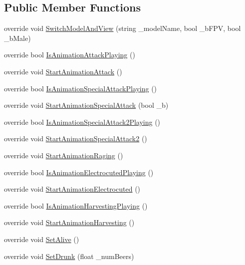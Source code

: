 \subsection*{Public Member Functions}
\begin{DoxyCompactItemize}
\item 
override void \mbox{\hyperlink{class_mecanim_s_d_x_a5a790d1838ab1258de11be176a5298b8}{Switch\+Model\+And\+View}} (string \+\_\+model\+Name, bool \+\_\+b\+F\+PV, bool \+\_\+b\+Male)
\item 
override bool \mbox{\hyperlink{class_mecanim_s_d_x_a1b94f6f47f059463f95ae6d61c80a565}{Is\+Animation\+Attack\+Playing}} ()
\item 
override void \mbox{\hyperlink{class_mecanim_s_d_x_a543eebebb28bb83ffc3b5cb55820f38c}{Start\+Animation\+Attack}} ()
\item 
override bool \mbox{\hyperlink{class_mecanim_s_d_x_ab53b82df62046df779432b2777526e69}{Is\+Animation\+Special\+Attack\+Playing}} ()
\item 
override void \mbox{\hyperlink{class_mecanim_s_d_x_ac65f5041a8f62a2f7e7eec84b8cdf446}{Start\+Animation\+Special\+Attack}} (bool \+\_\+b)
\item 
override bool \mbox{\hyperlink{class_mecanim_s_d_x_a8d61341c1b126e94156629faba4e2683}{Is\+Animation\+Special\+Attack2\+Playing}} ()
\item 
override void \mbox{\hyperlink{class_mecanim_s_d_x_af08e226abe0cacc72cced0bb6db08480}{Start\+Animation\+Special\+Attack2}} ()
\item 
override void \mbox{\hyperlink{class_mecanim_s_d_x_a6e4c25012d26e7b01fdf4e252c65314d}{Start\+Animation\+Raging}} ()
\item 
override bool \mbox{\hyperlink{class_mecanim_s_d_x_a00c9160c184e2c78a3ec4ef8bd9b0c83}{Is\+Animation\+Electrocuted\+Playing}} ()
\item 
override void \mbox{\hyperlink{class_mecanim_s_d_x_ac029e3a33e4dd0b7aa49a16da767c0bb}{Start\+Animation\+Electrocuted}} ()
\item 
override bool \mbox{\hyperlink{class_mecanim_s_d_x_a453c7d9636ac85f8bc1eec14f9b9684b}{Is\+Animation\+Harvesting\+Playing}} ()
\item 
override void \mbox{\hyperlink{class_mecanim_s_d_x_accb9a9db5430753e8129f98d10e3e547}{Start\+Animation\+Harvesting}} ()
\item 
override void \mbox{\hyperlink{class_mecanim_s_d_x_a577be9ed10bcdc018f26ff5134e621d3}{Set\+Alive}} ()
\item 
override void \mbox{\hyperlink{class_mecanim_s_d_x_a74c8b0551772d504e8a8c93bc01fb885}{Set\+Drunk}} (float \+\_\+num\+Beers)

\end{DoxyCompactItemize}

